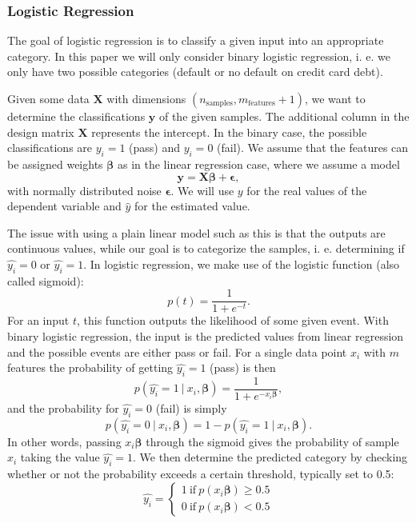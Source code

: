 \documentclass[%
 reprint,
nofootinbib,
 amsmath,amssymb,
 aps,
]{revtex4-2}
\begin{document}
\subsubsection{Logistic Regression}
The goal of logistic regression is to classify a given input into an appropriate category. In this paper we will only consider binary logistic regression, i. e. we only have two possible categories (default or no default on credit card debt).

Given some data $\boldsymbol{X}$ with dimensions $(n_{\textrm{samples}}, m_{\textrm{features}}+1)$, we want to determine the classifications $\boldsymbol{y}$ of the given samples. The additional column in the design matrix $\boldsymbol{X}$ represents the intercept. In the binary case, the possible classifications are $y_i = 1$ (pass) and $y_i = 0$ (fail). We assume that the features can be assigned weights $\boldsymbol{\beta}$ as in the linear regression case, where we assume a model
%
\begin{equation*}
\boldsymbol{y} = \boldsymbol{X}\boldsymbol{\beta} + \boldsymbol{\epsilon},
\end{equation*}
%
with normally distributed noise $\boldsymbol{\epsilon}$. We will use $y$ for the real values of the dependent variable and $\hat{y}$ for the estimated value.

The issue with using a plain linear model such as this is that the outputs are continuous values, while our goal is to categorize the samples, i. e. determining if $\hat{y_i} = 0$ or $\hat{y_i} = 1$. In logistic regression, we make use of the logistic function (also called sigmoid):
%
\begin{equation}\label{eq:sigmoid}
p(t) = \frac{1}{1 + e^{-t}} .
\end{equation}
%
For an input $t$, this function outputs the likelihood of some given event. With binary logistic regression, the input is the predicted values from linear regression and the possible events are either pass or fail. For a single data point $x_i$ with $m$ features the probability of getting $\hat{y_i} = 1$ (pass) is then
%
\begin{equation*}
p(\hat{y_i} = 1 \ | \ x_i, \boldsymbol{\beta}) = \frac{1}{1 + e^{-x_i\boldsymbol{\beta}}},
\end{equation*}
%
and the probability for $\hat{y_i} = 0$ (fail) is simply
%
\begin{equation*}
p(\hat{y_i} = 0 \ | \ x_i, \boldsymbol{\beta}) = 1 - p(\hat{y_i} = 1 \ | \ x_i, \boldsymbol{\beta}) .
\end{equation*}
%
In other words, passing $x_i\boldsymbol{\beta}$ through the sigmoid gives the probability of sample $x_i$ taking the value $\hat{y_i} = 1$. We then determine the predicted category by checking whether or not the probability exceeds a certain threshold, typically set to 0.5:
%
\begin{equation*}
\hat{y_i} =
\begin{cases}
1 \ \textrm{if} \ p(x_i\boldsymbol{\beta}) \geq 0.5 \\
0 \ \textrm{if} \ p(x_i\boldsymbol{\beta}) < 0.5
\end{cases}
\end{equation*}
\end{document}
